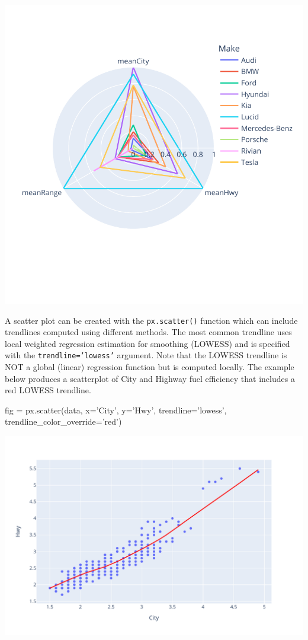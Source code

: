 \begin{center}
  \includegraphics[width=.8\textwidth]{px.fuel.radar.pdf}
\end{center}

A scatter plot can be created with the \texttt{px.scatter()} function which can include trendlines computed using different methods. The most common trendline uses local weighted regression estimation for smoothing (LOWESS) and is specified with the \texttt{trendline='lowess'} argument. Note that the LOWESS trendline is NOT a global (linear) regression function but is computed locally. The example below produces a scatterplot of City and Highway fuel efficiency that includes a red LOWESS trendline. 

\begin{pythoncode}
fig = px.scatter(data, 
    x='City', y='Hwy', 
    trendline='lowess',
    trendline_color_override='red')
\end{pythoncode}

\begin{center}
  \includegraphics[width=.8\textwidth]{px.fuel.linesSmooth.pdf}
\end{center}

